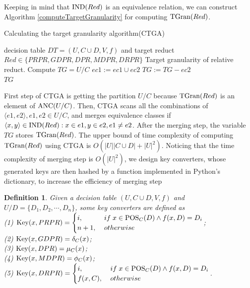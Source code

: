 \documentclass[review]{elsarticle}
\newtheorem{myDef}{Definition}
\begin{document}
		Keeping in mind that ${\rm IND}(Red)$ is an equivalence relation, we can construct Algorithm \ref{computeTargetGranularity} for computing ${\rm TGran}(Red)$.
		\begin{algorithm}[htb]
			\caption{Calculating the target granularity algorithm(CTGA)}
			\label{computeTargetGranularity}
			\begin{algorithmic}[1]
				\Require decision table $DT=(U, C \cup D,V,f)$ and target reduct $Red \in \{PRPR,GDPR,DPR,MDPR,DRPR\}$
				\Ensure Target granularity of relative reduct.
				\State Compute $TG=U/C$
				\State $ec1:=ec1 \cup ec2$
				\State $TG:=TG-ec2$
				\EndIf
				\EndFor
				\EndFor\\
				\Return $TG$
			\end{algorithmic}
		\end{algorithm}
		First step of CTGA is getting the partition $U/C$ because ${\rm TGran}(Red)$ is an element of ${\rm ANC}(U/C)$. Then, CTGA scans all the combinations of $\langle e1,e2\rangle , e1,e2 \in U/C$, and merges equivalence classes if $\langle x,y\rangle \in {\rm IND}(Red): x \in e1,y \in e2, e1 \neq e2$. After the merging step, the variable $TG$ stores ${\rm TGran}(Red)$. The upper bound of time complexity of computing ${\rm TGran}(Red)$ using CTGA is $O(|U||C \cup D|+|U|^2)$. Noticing that the time complexity of merging step is $O(|U|^2)$, we design key converters, whose generated keys are then hashed by a function implemented in Python's dictionary, to increase the efficiency of merging step
		\begin{myDef}
			Given a decision table $(U,C \cup D,V,f)$ and $U/D=\{D_1,D_2,\cdots,D_n\}$, some key converters are defined as\\
				{\rm(1)} $ {\rm Key}(x,PRPR)= \begin{cases}i ,\; &if \; x \in {\rm POS}_C(D) \wedge f(x,D)=D_i
				\\ n+1 ,\; &otherwise   \end{cases}$;\\
				{\rm(2)} ${\rm Key}(x,GDPR)=\delta_C(x)$;\\
				{\rm(3)} ${\rm Key}(x,DPR)=\mu_C(x)$;\\
				{\rm(4)} ${\rm Key}(x,MDPR)=\phi_C(x)$;\\
				{\rm(5)} ${\rm Key}(x,DRPR)=\begin{cases}i ,\; &if \; x \in {\rm POS}_C(D) \wedge f(x,D)=D_i\\ f(x,C) ,\; &otherwise \end{cases}$.
		\end{myDef}
\end{document}
